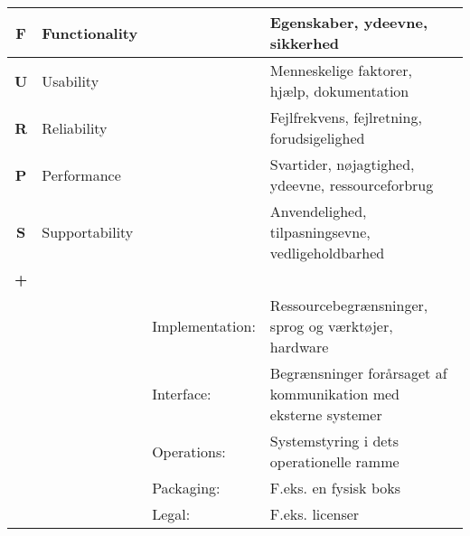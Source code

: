 \begin{figure*}[ht]{
    \centering
\begin{tabular}{|c | p{} p{} |p{}|}
       \hline
       \textbf{F}   &   Functionality   &&
       Egenskaber, ydeevne, sikkerhed                   \\
       \hline

       \textbf{U}   &   Usability       &&
       Menneskelige faktorer, hjælp, dokumentation      \\
       \hline

       \textbf{R}   &   Reliability     &&
       Fejlfrekvens, fejlretning, forudsigelighed       \\
       \hline

       \textbf{P}   &   Performance     &&
       Svartider, nøjagtighed, ydeevne, ressourceforbrug                                                      \\
       \hline

       \textbf{S}   &   Supportability  &&
       Anvendelighed, tilpasningsevne, vedligeholdbarhed                                                      \\
       \hline

       \textbf{+}   &                   &&              \\

       &&   Implementation: &   Ressourcebegrænsninger, sprog og værktøjer, hardware                     \\

       &&   Interface:      &   Begrænsninger forårsaget af kommunikation med eksterne systemer              \\

       &&   Operations:     &   Systemstyring i dets operationelle ramme                              \\

       &&   Packaging:      &   F.eks. en fysisk boks   \\

       &&    Legal:         &   F.eks. licenser       \\
       \hline
\end{tabular}}
\end{figure*}

